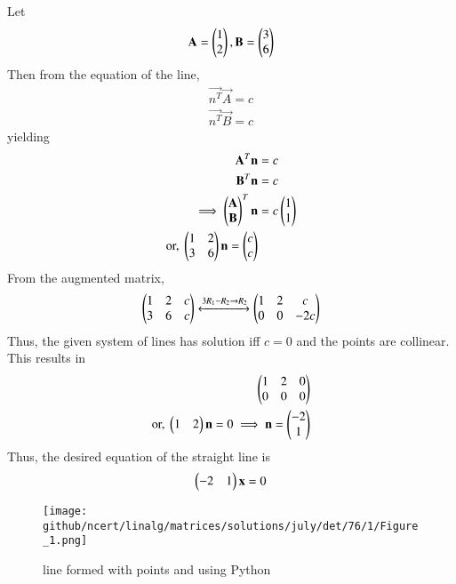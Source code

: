 Let 
\begin{align}
    \mathbf{A}=\begin{pmatrix}1\\2\end{pmatrix}, \mathbf{B}=\begin{pmatrix}3\\6\end{pmatrix}
\end{align}
Then from the equation of the line, 
\begin {align}
\vec{n^T} \vec {A}=c \label{july/1/76/eq:1} \\
\vec{n^T} \vec {B}=c  \label{july/1/76/eq:2} 
\end{align}
yielding
\begin{align}
    \mathbf{A}^T \mathbf {n}&=c \\
    \mathbf{B}^T \mathbf {n}&=c  \\
\implies     \begin{pmatrix}\mathbf{A} \\ \mathbf{B}\end{pmatrix}^T \mathbf{n}&=c\begin{pmatrix}1 \\ 1\end{pmatrix} \\
 \text{or, }  \begin{pmatrix}1 &2 \\ 3&6\end{pmatrix} \mathbf{n}=\begin{pmatrix}c\\c\end{pmatrix}
\end{align}
From the augmented matrix, 
\begin{align}
\begin{pmatrix} 1 &  2 & c \\ 3&  6& c \end{pmatrix} \xleftrightarrow{{3R_1-R_2\rightarrow R_2}} \begin{pmatrix} 1 &  2& c\\0 &  0 & -2c \end{pmatrix}
\end{align}
Thus,  the given system of lines has solution iff  $c = 0$  and the points are collinear.  This results in 
\begin{align}
    \begin{pmatrix} 1 &  2& 0\\0 &  0 & 0 \end{pmatrix} \\
\text{or, }    \begin{pmatrix}1&2\end{pmatrix}\mathbf{n}=0
\implies \mathbf{n}= \begin{pmatrix}-2\\1\end{pmatrix}
\end{align}
Thus, the desired equation of the straight line is 
\begin{align}
    \begin{pmatrix}-2&1\end{pmatrix} \mathbf{x}=0 
\end{align}
\begin{figure}[H]
\centering
\texttt{[image: github/ncert/linalg/matrices/solutions/july/det/76/1/Figure\_1.png]}
\caption{line formed with points  and  using Python}
\label{july/1/76/fig:1}
\end{figure}
